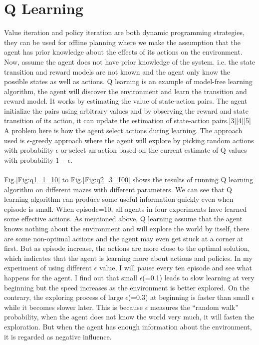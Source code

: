 \documentclass[11pt]{article}
\begin{document}
\section{Q Learning}
Value iteration and policy iteration are both dynamic programming strategies, they can be used for offline planning where we make the assumption that the agent has prior knowledge about the effects of its actions on the environment. Now, assume the agent does not have prior knowledge of the system. i.e. the state transition and reward models are not known and the agent only know the possible states as well as actions. Q learning is an example of model-free learning algorithm, the agent will discover the environment and learn the transition and reward model. It works by estimating the value of state-action pairs. The agent initialize the pairs using arbitrary values and by observing the reward and state transition of its action, it can update the estimation of state-action pairs.[3][4][5] A problem here is how the agent select actions during learning. The approach used is $\epsilon$-greedy approach where the agent will explore by picking random actions with probability $\epsilon$ or select an action based on the current estimate of Q values with probability $1-\epsilon$.\\
\\Fig.\ref{Fig:q1_1_10} to Fig.\ref{Fig:q2_3_100} shows the results of running Q learning algorithm on different mazes with different parameters. We can see that Q learning algorithm can produce some useful information quickly even when episode is small. When episode=10, all agents in four experiments have learned some effective actions. As mentioned above, Q learning assume that the agent knows nothing about the environment and will explore the world by itself, there are some non-optimal actions and the agent may even get stuck at a corner at first. But as episode increase, the actions are more close to the optimal solution, which indicates that the agent is learning more about actions and policies. In my experiment of using different $\epsilon$ value, I will pause every ten episode and see what happens for the agent. I find out that small $\epsilon$(=0.1) leads to slow learning at very beginning but the speed increases as the environment is better explored. On the contrary, the exploring process of large $\epsilon$(=0.3) at beginning is faster than small $\epsilon$ while it becomes slower later. This is because $\epsilon$ measures the ``random walk'' probability, when the agent does not know the world very much, it will fasten the exploration. But when the agent has enough information about the environment, it is regarded as  negative influence.
\end{document}
